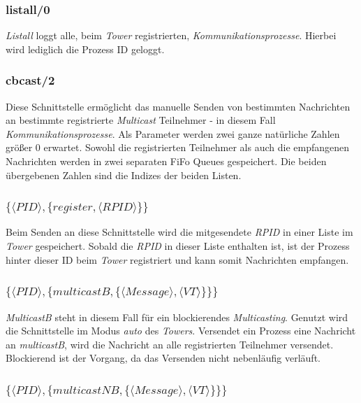 \subsubsection{listall/0}

\textit{Listall} loggt alle, beim \textit{Tower} registrierten, \textit{Kommunikationsprozesse}. Hierbei wird lediglich die Prozess ID geloggt.

\subsubsection{cbcast/2} \label{tower_cbcast}

Diese Schnittstelle ermöglicht das manuelle Senden von bestimmten Nachrichten an bestimmte registrierte \textit{Multicast} Teilnehmer - in diesem Fall \textit{Kommunikationsprozesse}. Als Parameter werden zwei ganze natürliche Zahlen größer 0 erwartet. Sowohl die registrierten Teilnehmer als auch die empfangenen Nachrichten werden in zwei separaten FiFo Queues gespeichert. Die beiden übergebenen Zahlen sind die Indizes der beiden Listen. 

\subsubsection{$\{\langle PID \rangle,\{register,\langle RPID\rangle\}\}$}

Beim Senden an diese Schnittstelle wird die mitgesendete \textit{RPID} in einer Liste im \textit{Tower} gespeichert. Sobald die \textit{RPID} in dieser Liste enthalten ist, ist der Prozess hinter dieser ID beim \textit{Tower} registriert und kann  somit Nachrichten empfangen.

\subsubsection{$\{\langle PID\rangle,\{multicastB,\{\langle Message\rangle,\langle VT\rangle\}\}\}$}

\textit{MulticastB} steht in diesem Fall für ein blockierendes \textit{Multicasting}. Genutzt wird die Schnittstelle im Modus \textit{auto} des \textit{Towers}. Versendet ein Prozess eine Nachricht an \textit{multicastB}, wird die Nachricht an alle registrierten Teilnehmer versendet. Blockierend ist der Vorgang, da das Versenden nicht nebenläufig verläuft.

\subsubsection{$\{\langle PID\rangle,\{multicastNB,\{\langle Message\rangle,\langle VT\rangle\}\}\}$} 

